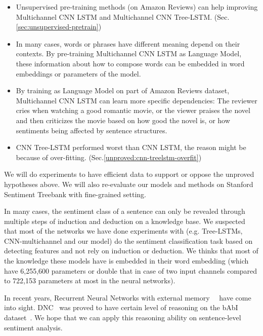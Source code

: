 \begin{itemize}
\item Unsupervised pre-training methods (on Amazon Reviews) can help improving Multichannel CNN LSTM and Multichannel CNN Tree-LSTM. (Sec.\ref{sec:unsupervised-pretrain})

\item In many cases, words or phrases have different meaning depend on their contexts.
By pre-training Multichannel CNN LSTM as Language Model, these information about how to compose words can be embedded in word embeddings or parameters of the model.

\item By training as Language Model on part of Amazon Reviews dataset, Multichannel CNN LSTM can learn more specific dependencies: The reviewer cries when watching a good romantic movie, or the viewer praises the novel and then criticizes the movie based on how good the novel is, or how sentiments being affected by sentence structures. 

\item CNN Tree-LSTM performed worst than CNN LSTM, the reason might be because of over-fitting. (Sec.\ref{unproved:cnn-treelstm-overfit})
\end{itemize}

We will do experiments to have efficient data to support or oppose the unproved hypotheses above.
We will also re-evaluate our models and methods on Stanford Sentiment Treebank with fine-grained setting.

In many cases, the sentiment class of a sentence can only be revealed through multiple steps of induction and deduction on a knowledge base.
We suspected that most of the networks we have done experiments with (e.g. Tree-LSTMs, CNN-multichannel and our model) do the sentiment classification task based on detecting features and not rely on induction or deduction.
We thinks that most of the knowledge these models have is embedded in their word embedding (which have 6,255,600 parameters or double that in case of two input channels compared to 722,153 parameters at most in the neural networks).

In recent years, Recurrent Neural Networks with external memory~\cite{Graves_Nature2016}~\cite{neural-turing-machine} have come into sight.
DNC~\cite{Graves_Nature2016} was proved to have certain level of reasoning on the bAbI dataset~\cite{bAbi}.
We hope that we can apply this reasoning ability on sentence-level sentiment analysis.
